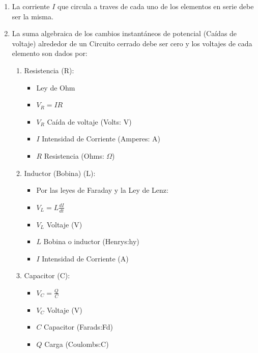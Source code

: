 \begin{enumerate}
  \item La corriente \(\displaystyle I\) que circula a traves de cada uno de los elementos en serie debe ser la misma.
  \item La suma algebraica de los cambios instantáneos de potencial (Caídas de voltaje) alrededor de un Circuito cerrado debe ser cero y los voltajes de cada elemento son dados por:

  \begin{enumerate}
    \item Resistencia (R):

    \begin{itemize}
      \item Ley de Ohm
      \item \(\displaystyle V_{R}=IR \)
      \item \(\displaystyle V_{R}\) Caída de voltaje (Volts: V)
      \item \(\displaystyle I\) Intensidad de Corriente (Amperes: A)
      \item \(\displaystyle R\) Resistencia (Ohms: \(\displaystyle\Omega\))
    \end{itemize}

    \item Inductor (Bobina) (L):
    \begin{itemize}
      \item Por las leyes de Faraday y la Ley de Lenz:
      \item \(\displaystyle V_{L}=L\frac{dI}{dt} \)
      \item \(\displaystyle V_{L}\) Voltaje (V)
      \item \(\displaystyle L\) Bobina o inductor (Henrys:hy)
      \item \(\displaystyle I\) Intensidad de Corriente (A)
    \end{itemize}

    \item Capacitor (C):
    \begin{itemize}
      \item \(\displaystyle V_{C}=\frac{Q}{C}\)
      \item \(\displaystyle V_{C}\) Voltaje (V)
      \item \(\displaystyle C\) Capacitor (Farads:Fd)
      \item \(\displaystyle Q\) Carga (Coulombs:C)
    \end{itemize}
  \end{enumerate}
\end{enumerate}

